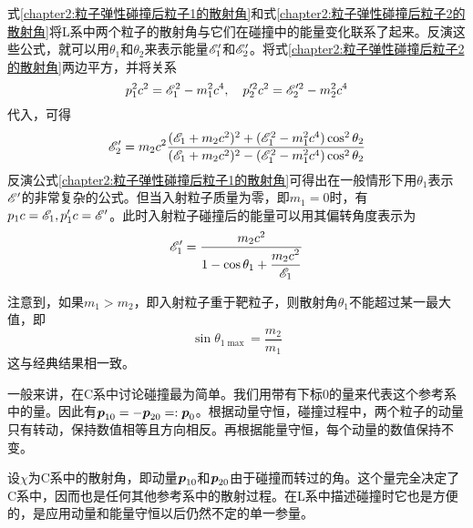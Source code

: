 式\eqref{chapter2:粒子弹性碰撞后粒子1的散射角}和式\eqref{chapter2:粒子弹性碰撞后粒子2的散射角}将L系中两个粒子的散射角与它们在碰撞中的能量变化联系了起来。反演这些公式，就可以用$\theta_1$和$\theta_2$来表示能量$\mathscr{E}'_1$和$\mathscr{E}'_2$。将式\eqref{chapter2:粒子弹性碰撞后粒子2的散射角}两边平方，并将关系
\begin{equation*}
	p_1^2c^2 = \mathscr{E}_1^2 - m_1^2c^4,\quad p_2'^2c^2 = \mathscr{E}_2'^2-m_2^2c^4
\end{equation*}
代入，可得
\begin{equation}
	\mathscr{E}_2' = m_2c^2 \frac{(\mathscr{E}_1+m_2c^2)^2 + (\mathscr{E}_1^2-m_1^2c^4)\cos^2 \theta_2}{(\mathscr{E}_1+m_2c^2)^2 - (\mathscr{E}_1^2-m_1^2c^4)\cos^2 \theta_2}
	\label{chapter2:粒子的弹性碰撞6}
\end{equation}
反演公式\eqref{chapter2:粒子弹性碰撞后粒子1的散射角}可得出在一般情形下用$\theta_1$表示$\mathscr{E}'$的非常复杂的公式。但当入射粒子质量为零，即$m_1=0$时，有$p_1c = \mathscr{E}_1, p_1'c = \mathscr{E}'$。此时入射粒子碰撞后的能量可以用其偏转角度表示为
\begin{equation}
	\mathscr{E}_1' = \frac{m_2c^2}{1-\cos\theta_1+\dfrac{m_2c^2}{\mathscr{E}_1}}
\end{equation}

注意到，如果$m_1>m_2$，即入射粒子重于靶粒子，则散射角$\theta_1$不能超过某一最大值，即
\begin{equation}
	\sin \theta_{1\max} = \frac{m_2}{m_1}
	\label{chapter2:粒子的弹性碰撞7}
\end{equation}
这与经典结果相一致。

一般来讲，在C系中讨论碰撞最为简单。我们用带有下标$0$的量来代表这个参考系中的量。因此有$\boldsymbol{p}_{10} = -\boldsymbol{p}_{20} =:\boldsymbol{p}_0$。根据动量守恒，碰撞过程中，两个粒子的动量只有转动，保持数值相等且方向相反。再根据能量守恒，每个动量的数值保持不变。

设$\chi$为C系中的散射角，即动量$\boldsymbol{p}_{10}$和$\boldsymbol{p}_{20}$由于碰撞而转过的角。这个量完全决定了C系中，因而也是任何其他参考系中的散射过程。在L系中描述碰撞时它也是方便的，是应用动量和能量守恒以后仍然不定的单一参量。

